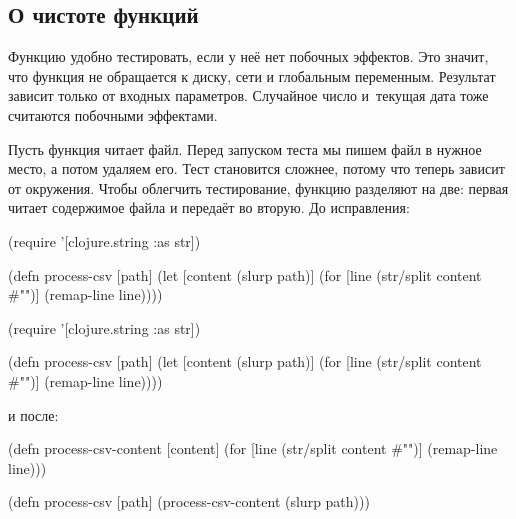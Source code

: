 \subsection{О чистоте функций}


Функцию удобно тестировать, если у неё нет побочных эффектов. Это значит, что
функция не обращается к диску, сети и глобальным переменным. Результат зависит
только от входных параметров. Случайное число и~текущая дата тоже считаются
побочными эффектами.

Пусть функция читает файл. Перед запуском теста мы пишем файл в нужное место, а
потом удаляем его. Тест становится сложнее, потому что теперь зависит от
окружения. Чтобы облегчить тестирование, функцию разделяют на две: первая читает
содержимое файла и передаёт во вторую. До исправления:


\ifx\DEVICETYPE\MOBILE

\begin{english}
  \begin{clojure}
(require '[clojure.string :as str])

(defn process-csv [path]
  (let [content (slurp path)]
    (for [line (str/split content #"\n")]
      (remap-line line))))
  \end{clojure}
\end{english}

\else

\begin{english}
  \begin{clojure}
(require '[clojure.string :as str])

(defn process-csv [path]
  (let [content (slurp path)]
    (for [line (str/split content #"\n")]
      (remap-line line))))
  \end{clojure}
\end{english}

\fi

\noindent
и после:

\ifx\DEVICETYPE\MOBILE

\begin{english}
  \begin{clojure}
(defn process-csv-content [content]
  (for [line (str/split content #"\n")]
    (remap-line line)))

(defn process-csv [path]
  (process-csv-content (slurp path)))
  \end{clojure}
\end{english}

